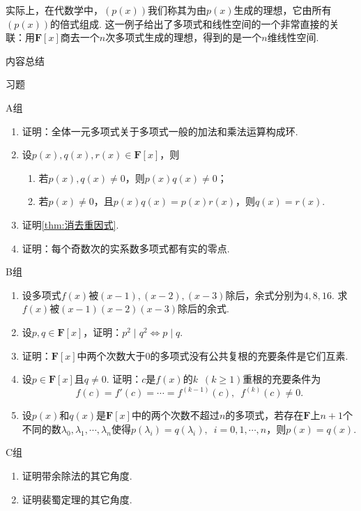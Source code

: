 实际上，在代数学中，$(p(x))$我们称其为由$p(x)$生成的理想，它由所有$(p(x))$的倍式组成. 这一例子给出了多项式和线性空间的一个非常直接的关联：用$\mathbf{F}[x]$商去一个$n$次多项式生成的理想，得到的是一个$n$维线性空间.

\vspace{2ex}
\centerline{\heiti \Large 内容总结}


\vspace{2ex}
\centerline{\heiti \Large 习题}

\vspace{2ex}
{\kaishu }
\begin{flushright}
    \kaishu

\end{flushright}

\centerline{\heiti A组}
\begin{enumerate}
    \item 证明：全体一元多项式关于多项式一般的加法和乘法运算构成环.
    \item 设$p(x),q(x),r(x)\in\mathbf{F}[x]$，则
          \begin{enumerate}
              \item 若$p(x),q(x)\neq 0$，则$p(x)q(x)\neq 0$；
              \item 若$p(x)\neq 0$，且$p(x)q(x)=p(x)r(x)$，则$q(x)=r(x)$.
          \end{enumerate}
    \item 证明\autoref{thm:消去重因式}.
    \item 证明：每个奇数次的实系数多项式都有实的零点.
\end{enumerate}

\centerline{\heiti B组}
\begin{enumerate}
    \item 设多项式$f(x)$被$(x-1),(x-2),(x-3)$除后，余式分别为$4,8,16$. 求$f(x)$被$(x-1)(x-2)(x-3)$除后的余式.
    \item 设$p,q\in\mathbf{F}[x]$，证明：$p^2 \mid q^2\iff p \mid q$.
    \item 证明：$\mathbf{F}[x]$中两个次数大于0的多项式没有公共复根的充要条件是它们互素.
    \item 设$p\in\mathbf{F}[x]$且$q\neq 0$. 证明：$c$是$f(x)$的$k\enspace(k\geqslant 1)$重根的充要条件为
          \[f(c)=f'(c)=\cdots=f^{(k-1)}(c),\enspace f^{(k)}(c)\neq 0.\]
    \item 设$p(x)$和$q(x)$是$\mathbf{F}[x]$中的两个次数不超过$n$的多项式，若存在$\mathbf{F}$上$n+1$个不同的数$\lambda_0,\lambda_1,\cdots,\lambda_n$使得$p(\lambda_i)=q(\lambda_i),\enspace i=0,1,\cdots,n$，则$p(x)=q(x)$.
\end{enumerate}

\centerline{\heiti C组}
\begin{enumerate}
    \item 证明带余除法的其它角度.
    \item 证明裴蜀定理的其它角度.
\end{enumerate}
